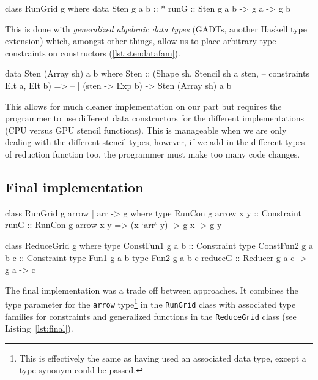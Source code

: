 \documentclass[
    12pt,
    a4paper,
    twoside,
    openright,
    ]{scrbook}
\begin{document}
\begin{hflisting}[label=lst:rundatafam,
caption=RunGrid with associated data family.]
class RunGrid g where
    data Sten g a b :: *
    runG :: Sten g a b -> g a -> g b
\end{hflisting}

This is done with \emph{generalized algebraic data types} (GADTs, another
Haskell type extension) which, amongst other things, allow us to place arbitrary
type constraints on constructors (\autoref{lst:stendatafam}).

\begin{hlisting}[label=lst:stendatafam,
caption={An example of a stencil data type for the GPU. Note the argument it takes is a stencil function (of type \texttt{sten -> Exp b}) where \texttt{sten} has been constrained in the required way.}]
data Sten (Array sh) a b where
        Sten :: (Shape sh, Stencil sh a sten,  -- constraints
                 Elt a, Elt b) =>              -- |
                (sten -> Exp b)
                -> Sten (Array sh) a b
\end{hlisting}

This allows for much cleaner implementation on our part but requires the
programmer to use different data constructors for the different implementations
(CPU versus GPU stencil functions). This is manageable when we are only dealing
with the different stencil types, however, if we add in the different types of
reduction function too, the programmer must make too many code changes.

\subsection{Final implementation}
\label{sec:final}

\begin{hflisting}[label=lst:final, caption={The final signatures of the
  \texttt{RunGrid} and \texttt{ReduceGrid} classes.}]
class RunGrid g arrow | arr -> g where
    type RunCon g arrow x y :: Constraint
    runG :: RunCon g arrow x y =>
            (x `arr` y)
            -> g x -> g y

class ReduceGrid g where
    type ConstFun1 g a b :: Constraint
    type ConstFun2 g a b c :: Constraint
    type Fun1 g a b
    type Fun2 g a b c
    reduceG :: Reducer g a c -> g a -> c
\end{hflisting}

The final implementation was a trade off between approaches. It combines the
type parameter for the \texttt{arrow} type\footnote{This is effectively the same
  as having used an associated data type, except a type synonym could be
  passed.} in the \texttt{RunGrid} class with associated type families for
constraints and generalized functions in the \texttt{ReduceGrid} class (see
Listing~\ref{lst:final}).
\end{document}
